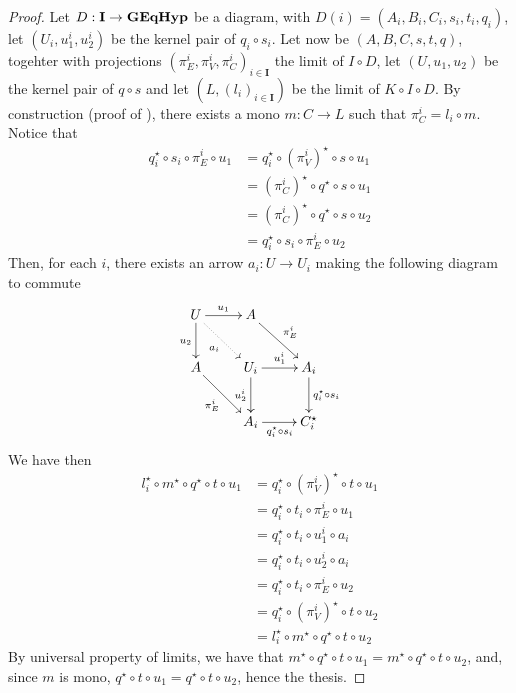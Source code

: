 \documentclass[a4paper,UKenglish,cleveref,pdftex,thm-restate,numberwithinsect]{lipics-v2021}
\newcommand{\cat}[1]{\ensuremath{\mathbf{#1}}}
\newcommand{\catname}[1]{\textbf{\textup{#1}}}
\newcommand{\egg}{\catname{GEqHyp}}
\begin{document}
\begin{proof}
	Let $D: \cat{I} \to \egg$ be a diagram, with $D(i) = (A_i, B_i, C_i, s_i, t_i, q_i)$, let $(U_i, u_1^i, u_2^i)$ be the kernel pair of $q_i\circ s_i$.
	Let now be $(A, B, C, s, t, q)$, togehter with projections $(\pi_E^i, \pi_V^i, \pi_C^i)_{i \in \cat I}$ the limit of $I \circ D$,
	let $(U, u_1, u_2)$ be the kernel pair of $q\circ s$ and let $(L, (l_i)_{i \in \cat I})$ be the limit of $K \circ I \circ D$.
	By construction (proof of ), there exists a mono $m: C \to L$ such that $\pi_C^i = l_i \circ m$. Notice that
	\begin{align*}
		q_i^\star \circ s_i\circ \pi^i_E\circ u_1      &= q_i^\star\circ (\pi^i_V)^\star \circ s\circ u_1\\
		&= (\pi_C^i)^\star\circ q^\star\circ s\circ u_1\\
		&=(\pi_C^i)^\star\circ q^\star\circ s\circ u_2\\
		&= q_i^\star \circ s_i \circ \pi_E^i \circ u_2
	\end{align*}
	Then, for each $i$, there exists an arrow $a_i:U\to U_i$ making the following diagram to commute
	\[
	\xymatrix{
		U \ar[r]^{u_1} \ar[d]_{u_2} \ar@{.>}[dr]_{a_i} & A \ar[dr]^{\pi_E^i} & \\
		A \ar[dr]_{\pi_E^i} & U_i \ar[r]^{u_1^i} \ar[d]_{u_2^i}& A_i \ar[d]^{q_i^\star \circ s_i} \\
		& A_i  \ar[r]_{q_i^\star \circ s_i}& C_i^\star
	}
	\]
	We have then
	\begin{align*}
		l_i^\star\circ m^\star \circ q^\star \circ t \circ u_1    &= q_i^\star\circ (\pi_V^i)^\star \circ t \circ u_1 \\
		&= q_i^\star \circ t_i \circ \pi_E^i \circ u_1 \\
		&= q_i^\star \circ t_i \circ u_1^i \circ a_i \\
		&= q_i^\star \circ t_i \circ u_2^i \circ a_i \\
		&= q_i^\star \circ t_i \circ \pi_E^i \circ u_2 \\
		&= q_i^\star \circ (\pi_V^i)^\star \circ t \circ u_2 \\
		&= l_i^\star \circ m^\star \circ q^\star \circ t \circ u_2
	\end{align*}
	By universal property of limits, we have that \- $m^\star\circ q^\star \circ t \circ u_1 = m^\star \circ q^\star \circ t \circ u_2$, and, since $m$ is mono, $q^\star \circ t \circ u_1 = q^\star \circ t \circ u_2$, hence the thesis.
\end{proof}
\end{document}
